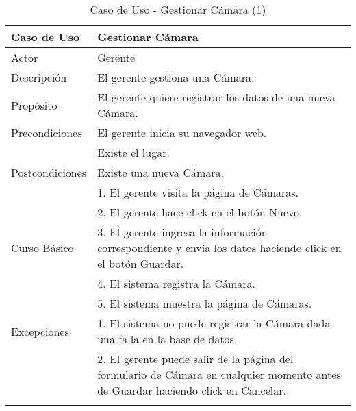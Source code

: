 \begin{longtable}{@{} p{3cm} p{10cm} @{}} \toprule
    \textbf{Caso de Uso}    & Gestionar Cámara \\ \midrule
    Actor                   & Gerente \\ \cmidrule{1-2}
    Descripción             & El gerente gestiona una Cámara. \\ \cmidrule{1-2}
    Propósito               & El gerente quiere registrar los datos de una nueva Cámara. \\ \cmidrule{1-2}
    Precondiciones          & El gerente inicia su navegador web. \\
                            & Existe el lugar. \\ \cmidrule{1-2} 
    Postcondiciones         & Existe una nueva Cámara. \\ \cmidrule{1-2} 
                            & 1. El gerente visita la página de Cámaras. \\ 
                            & 2. El gerente hace click en el botón Nuevo. \\
   Curso Básico             & 3. El gerente ingresa la información correspondiente y envía los datos haciendo click en el botón Guardar. \\
                            & 4. El sistema registra la Cámara. \\ 
                            & 5. El sistema muestra la página de Cámaras. \\ \cmidrule{1-2}
    Excepciones             & 1. El sistema no puede registrar la Cámara dada una falla en la base de datos. \\
                            & 2. El gerente puede salir de la página del formulario de Cámara en cualquier momento antes de Guardar haciendo click en Cancelar. \\ \bottomrule
   \caption{Caso de Uso - Gestionar Cámara (1)} \label{tab:tabcu-cam1} \\
   \end{longtable}


